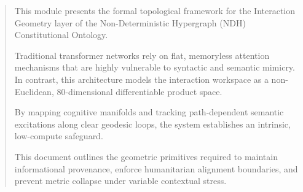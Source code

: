 \begin{abstract}
This module presents the formal
topological framework for the
Interaction Geometry layer of the
Non-Deterministic Hypergraph (NDH)
Constitutional Ontology. 

Traditional transformer networks
rely on flat, memoryless attention
mechanisms that are highly vulnerable
to syntactic and semantic mimicry. 
In contrast, this architecture models
the interaction workspace as a 
non-Euclidean, 80-dimensional 
differentiable product space.

By mapping cognitive manifolds and
tracking path-dependent semantic
excitations along clear geodesic loops,
the system establishes an intrinsic,
low-compute safeguard. 

This document outlines the geometric
primitives required to maintain
informational provenance, enforce
humanitarian alignment boundaries, and
prevent metric collapse under variable
contextual stress.
\end{abstract}
